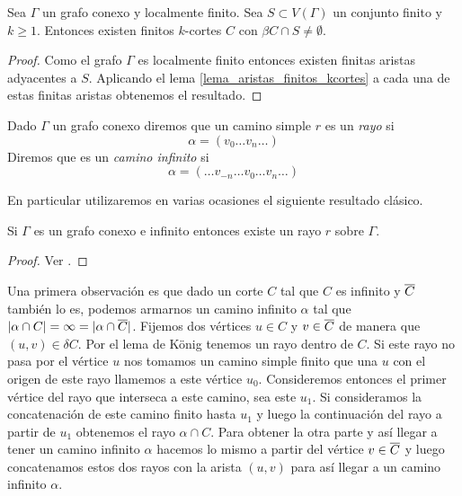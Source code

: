 \documentclass[tesis.tex]{subfiles}
\begin{document}
\begin{coro}\label{lema_finitos_kcortes}
	Sea $\Gamma$ un grafo conexo y localmente finito.
	Sea $S \subset V(\Gamma)$ un conjunto finito y $k\ge 1$.
	Entonces existen finitos $k$-cortes $C$ con $\beta C \cap S \neq \emptyset$.
\end{coro}	

\begin{proof}
	Como el grafo $\Gamma$ es localmente finito entonces existen finitas aristas adyacentes a $S$.
	Aplicando el lema \ref{lema_aristas_finitos_kcortes} a cada una de estas finitas aristas obtenemos el resultado.	
\end{proof}
	

\begin{deff}
	Dado $\Gamma$ un grafo conexo diremos que un camino simple $r$ es un \emph{rayo} si
	\[
	\alpha = (v_0 \dots v_{n} \dots)
	\]	
	Diremos que es un \emph{camino infinito} si
	\[
	\alpha = ( \dots v_{-n} \dots v_0 \dots v_{n} \dots )
	\]
\end{deff}		


En particular utilizaremos en varias ocasiones el siguiente resultado clásico.


\begin{lema}[König]
	Si $\Gamma$ es un grafo conexo e infinito entonces existe un rayo $r$ sobre $\Gamma$.
\end{lema}
\begin{proof}
	Ver \cite{diestel2005graph}.
\end{proof}


Una primera observación es que dado un corte $C$ tal que $C$ es infinito y $\overline C$ también lo es, podemos armarnos un camino infinito $\alpha$ tal que $|\alpha \cap C| = \infty = |\alpha \cap \overline C|$.
Fijemos dos vértices $u \in C$ y $v \in \overline C$ de manera que $(u,v) \in \delta C$.
Por el lema de König  tenemos un rayo dentro de $C$.
Si este rayo no pasa por el vértice $u$ nos tomamos un camino simple finito que una $u$ con el origen de este rayo llamemos a este vértice $u_{0}$.
Consideremos entonces el primer vértice del rayo que interseca a este camino, sea este $u_{1}$.
Si consideramos la concatenación de este camino finito hasta $u_{1}$ y luego la continuación del rayo a partir de $u_{1}$ obtenemos el rayo $\alpha \cap C$.
Para obtener la otra parte y así llegar a tener un camino infinito $\alpha$ hacemos lo mismo a partir del vértice $v \in \overline C$ y luego concatenamos estos dos rayos con la arista $(u,v)$ para así llegar a un camino infinito $\alpha$. 
\end{document}
